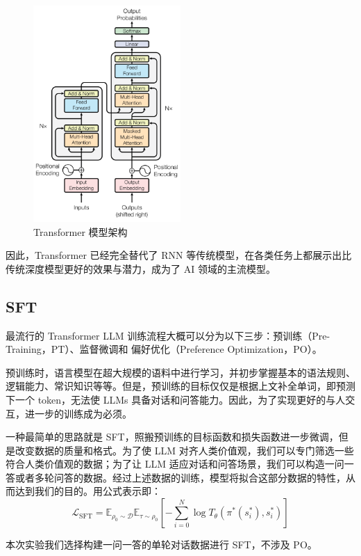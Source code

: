 \begin{figure}[htbp]
    \centering
    \includegraphics[width=0.5\textwidth]{images/model.png}
    \caption{Transformer 模型架构}
\end{figure}

因此，Transformer 已经完全替代了 RNN 等传统模型，在各类任务上都展示出比传统深度模型更好的效果与潜力，成为了 AI 领域的主流模型。

\subsection{SFT}

最流行的 Transformer LLM 训练流程大概可以分为以下三步：预训练（Pre-Training，PT）、监督微调和 偏好优化（Preference Optimization，PO）。

预训练时，语言模型在超大规模的语料中进行学习，并初步掌握基本的语法规则、逻辑能力、常识知识等等。但是，预训练的目标仅仅是根据上文补全单词，即预测下一个 token，无法使 LLMs 具备对话和问答能力。因此，为了实现更好的与人交互，进一步的训练成为必须。

一种最简单的思路就是 SFT，照搬预训练的目标函数和损失函数进一步微调，但是改变数据的质量和格式。为了使 LLM 对齐人类价值观，我们可以专门筛选一些符合人类价值观的数据；为了让 LLM 适应对话和问答场景，我们可以构造一问一答或者多轮问答的数据。经过上述数据的训练，模型将拟合这部分数据的特性，从而达到我们的目的。用公式表示即：
\[\mathcal{L}_{\text{SFT}} = \mathbb{E}_{\rho_0 \sim \mathcal{D}} \mathbb{E}_{\tau \sim \rho_0} \left[ - \sum_{i=0}^{N} \log T_{\theta}(\pi^*(s_i^*), s_i^*) \right]
\]

本次实验我们选择构建一问一答的单轮对话数据进行 SFT，不涉及 PO。

